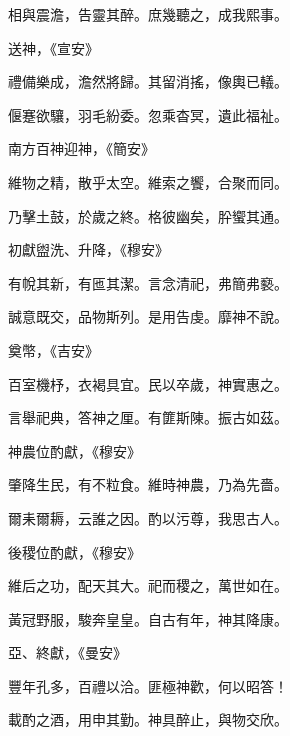 \begin{pinyinscope}
 相與震澹，告靈其醉。庶幾聽之，成我熙事。



 送神，《宣安》



 禮備樂成，澹然將歸。其留消搖，像輿已轙。



 偃蹇欲驤，羽毛紛委。忽乘杳冥，遺此福祉。



 南方百神迎神，《簡安》



 維物之精，散乎太空。維索之饗，合聚而同。



 乃擊土鼓，於歲之終。格彼幽矣，肸蠁其通。



 初獻盥洗、升降，《穆安》



 有帨其新，有匜其潔。言念清祀，弗簡弗褻。



 誠意既交，品物斯列。是用告虔。靡神不說。



 奠幣，《吉安》



 百室機杼，衣褐具宜。民以卒歲，神實惠之。



 言舉祀典，答神之厘。有篚斯陳。振古如茲。



 神農位酌獻，《穆安》



 肇降生民，有不粒食。維時神農，乃為先嗇。



 爾耒爾耨，云誰之因。酌以污尊，我思古人。



 後稷位酌獻，《穆安》



 維后之功，配天其大。祀而稷之，萬世如在。



 黃冠野服，駿奔皇皇。自古有年，神其降康。



 亞、終獻，《曼安》



 豐年孔多，百禮以洽。匪極神歡，何以昭答！



 載酌之酒，用申其勤。神具醉止，與物交欣。




\end{pinyinscope}
